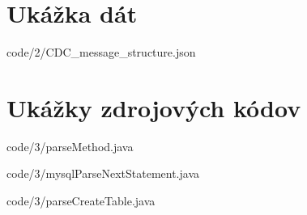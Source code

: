 \appendix	
\printnomenclature
\label{apx:zkratky}
\chapter{Ukážka dát}


            {code/2/CDC_message_structure.json}

\chapter{Ukážky zdrojových kódov}


            {code/3/parseMethod.java}


            {code/3/mysqlParseNextStatement.java}


            {code/3/parseCreateTable.java}


